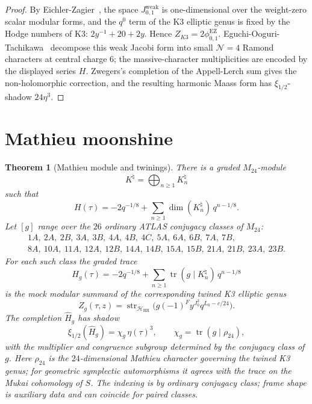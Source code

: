 \documentclass[11pt]{article}
\newtheorem{theorem}{Theorem}[section]
\newcommand{\str}{\operatorname{str}}
\newcommand{\xiop}{\xi_{1/2}}
\begin{document}
\begin{proof}
By Eichler-Zagier~\cite{EichlerZagier1985}, the space
$J^{\mathrm{weak}}_{0,1}$ is one-dimensional over the
weight-zero scalar modular forms, and the $q^0$ term of the K3
elliptic genus is fixed by the Hodge numbers of K3:
$2y^{-1}+20+2y$. Hence $Z_{K3}=2\phi_{0,1}^{\mathrm{EZ}}$.
Eguchi-Ooguri-Tachikawa~\cite{EguchiOoguriTachikawa2011} decompose
this weak Jacobi form into
small $\mathcal N=4$ Ramond characters at central charge $6$; the
massive-character multiplicities are encoded by the displayed
series $H$. Zwegers's completion of the Appell-Lerch sum gives the
non-holomorphic correction, and the resulting harmonic Maass form
has $\xi_{1/2}$-shadow $24\eta^3$.
\end{proof}

\section{Mathieu moonshine}
\label{sec:mathieu}

\begin{theorem}[Mathieu module and twinings]
\label{thm:mathieu-module}
There is a graded $M_{24}$-module
\[
  K^\natural=\bigoplus_{n\geq 1}K_n^\natural
\]
such that
\[
  H(\tau)=-2q^{-1/8}
  +\sum_{n\geq 1}\dim(K_n^\natural)\,q^{n-1/8}.
\]
Let $[g]$ range over the $26$ ordinary ATLAS conjugacy classes of
$M_{24}$:
\[
\begin{gathered}
1A,\ 2A,\ 2B,\ 3A,\ 3B,\ 4A,\ 4B,\ 4C,\ 5A,\ 6A,\ 6B,\ 7A,\ 7B,\\
8A,\ 10A,\ 11A,\ 12A,\ 12B,\ 14A,\ 14B,\ 15A,\ 15B,\ 21A,\ 21B,\
23A,\ 23B .
\end{gathered}
\]
For each such class the graded trace
\[
  H_g(\tau)=-2q^{-1/8}
  +\sum_{n\geq 1}\operatorname{tr}(g\mid K_n^\natural)\,q^{n-1/8}
\]
is the mock modular summand of the corresponding twined K3 elliptic
genus
\[
  Z_g(\tau,z)=
  \str_{\mathcal H_{\mathrm{RR}}}
  \bigl(g(-1)^F y^{J_0^3}q^{L_0-c/24}\bigr).
\]
The completion $\widehat H_g$ has shadow
\[
  \xiop(\widehat H_g)=\chi_g\,\eta(\tau)^3,
  \qquad
  \chi_g=\operatorname{tr}(g\mid \rho_{24}),
\]
with the multiplier and congruence subgroup determined by the
conjugacy class of $g$. Here $\rho_{24}$ is the $24$-dimensional
Mathieu character governing the twined K3 genus; for geometric
symplectic automorphisms it agrees with the trace on the Mukai
cohomology of $S$. The indexing is by ordinary conjugacy class; frame
shape is auxiliary data and can coincide for paired classes.
\end{theorem}
\end{document}
